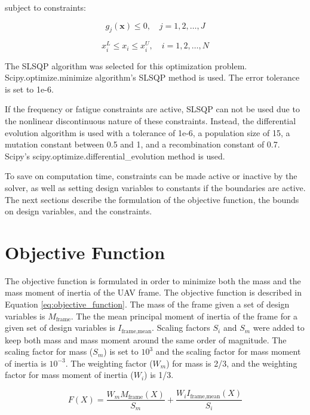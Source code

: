 \documentclass[doublespace,nopageskip]{VTthesis}
\begin{document}
		 subject to constraints:
		 
		 \begin{equation}
		 	g_j(\mathbf{x}) \le 0, \quad j = 1, 2, \dots, J
		 	\label{eq:opt_constraints}
		 \end{equation}
		 
		 \begin{equation}
		 	x_i^L \le x_i \le x_i^U, \quad i = 1, 2, \dots, N
		 	\label{eq:opt_bounds}
		 \end{equation}
		
		The SLSQP algorithm was selected for this optimization problem. Scipy.optimize.minimize algorithm's SLSQP method is used. The error tolerance is set to 1e-6. 
		
		If the frequency or fatigue constraints are active, SLSQP can not be used due to the nonlinear discontinuous nature of these constraints. Instead, the differential evolution algorithm is used with a tolerance of 1e-6, a population size of 15, a mutation constant between 0.5 and 1, and a recombination constant of 0.7. Scipy's scipy.optimize.differential\_evolution method is used.
		
		To save on computation time, constraints can be made active or inactive by the solver, as well as setting design variables to constants if the boundaries are active. The next sections describe the formulation of the objective function, the bounds on design variables, and the constraints. 
		
		
	\section{Objective Function} \label{se:obj}
		
		The objective function is formulated in order to minimize both the mass and the mass moment of inertia of the UAV frame. The objective function is described in Equation \ref{eq:objective_function}. The mass of the frame given a set of design variables is $M_{\text{frame}}$. The the mean principal moment of inertia of the frame for a given set of design variables is $I_{\text{frame,mean}}$. Scaling factors $S_i$ and $S_m$ were added to keep both mass and mass moment around the same order of magnitude. The scaling factor for mass ($S_m$) is set to $10^3$ and the scaling factor for mass moment of inertia is $10^{-3}$. The weighting factor ($W_m$) for mass is 2/3, and the weighting factor for mass moment of inertia ($W_i$) is 1/3.
		
		\begin{equation}
			F(X) =
			\frac{W_mM_{\text{frame}}(X)}{S_m}
			+
			\frac{W_iI_{\text{frame,mean}}(X)}{S_i}
			\label{eq:objective_function}
		\end{equation}
		
\end{document}
